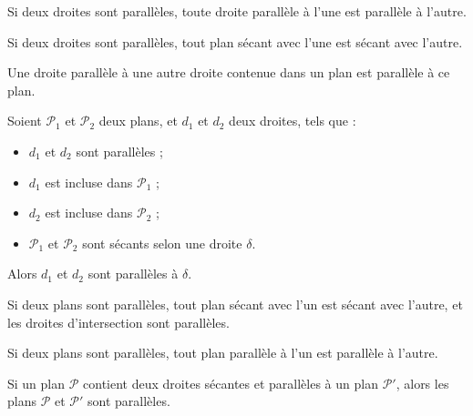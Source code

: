 \documentclass[10pt]{article}
\begin{document}
\begin{propriete}
  Si deux droites sont parallèles, toute droite parallèle à l'une est parallèle à l'autre.
\end{propriete}

\begin{propriete}
  Si deux droites sont parallèles, tout plan sécant avec l'une est sécant avec l'autre.
\end{propriete}

\begin{propriete}
  Une droite parallèle à une autre droite contenue dans un plan est parallèle à ce plan.
\end{propriete}

\begin{theoreme}
  Soient $\mathcal{P}_1$ et $\mathcal{P}_2$ deux plans, et $d_1$ et $d_2$ deux droites, tels que :
  \begin{itemize}
    \item $d_1$ et $d_2$ sont parallèles ;
    \item $d_1$ est incluse dans $\mathcal{P}_1$ ;
    \item $d_2$ est incluse dans $\mathcal{P}_2$ ;
    \item $\mathcal{P}_1$ et $\mathcal{P}_2$ sont sécants selon une droite $\delta$.
  \end{itemize}
  Alors $d_1$ et $d_2$ sont parallèles à $\delta$.

\end{theoreme}

\begin{propriete}
  Si deux plans sont parallèles, tout plan sécant avec l'un est sécant avec
  l'autre, et les droites d'intersection sont parallèles.
\end{propriete}

\begin{propriete}
  Si deux plans sont parallèles, tout plan parallèle à l'un est parallèle à l'autre.
\end{propriete}

\begin{propriete}
  Si un plan $\mathcal P$ contient deux droites sécantes et parallèles à un
  plan $\mathcal P'$, alors les plans $\mathcal P$ et $\mathcal P'$ sont
  parallèles.
\end{propriete}
\end{document}
